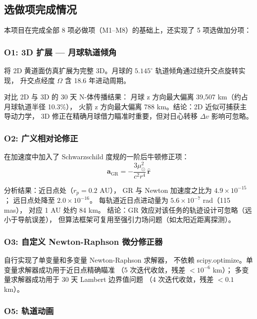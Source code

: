 \documentclass[12pt,a4paper]{ctexart}
\begin{document}
\subsection{选做项完成情况}

本项目在完成全部 8 项必做项（M1--M8）的基础上，还实现了 5 项选做加分项：

\subsubsection*{O1: 3D 扩展 — 月球轨道倾角}

将 2D 黄道面仿真扩展为完整 3D。月球的 $5.145^\circ$ 轨道倾角通过绕升交点旋转实现，
升交点经度 $\Omega$ 含 18.6 年进动周期。

对比 2D 与 3D 的 30 天 N-体传播结果：
月球 z 方向最大偏离 39{,}507 km（约占月球轨道半径 10.3\%），
火箭 z 方向最大偏离 788 km。结论：2D 近似可捕获主导动力学，
3D 修正在精确月球借力瞄准时重要，但对日心转移 $\Delta v$ 影响可忽略。

\subsubsection*{O2: 广义相对论修正}

在加速度中加入了 Schwarzschild 度规的一阶后牛顿修正项：
\begin{equation}
\mathbf{a}_{\text{GR}} = -\frac{3\mu_\odot^2}{c^2 r^4}\,\hat{\mathbf{r}}
\end{equation}

分析结果：近日点处（$r_p = 0.2$ AU），
GR 与 Newton 加速度之比为 $4.9 \times 10^{-15}$；
远日点处降至 $2.0 \times 10^{-16}$。
每轨道近日点进动量为 $5.6 \times 10^{-7}$ rad（115 mas），
对应 1 AU 处约 84 km。
结论：GR 效应对该任务的轨迹设计可忽略（远小于导航误差），
但算法框架可复用至强引力场问题（如太阳近距离探测）。

\subsubsection*{O3: 自定义 Newton-Raphson 微分修正器}

自行实现了单变量和多变量 Newton-Raphson 求解器，
不依赖 scipy.optimize。单变量求解器成功用于近日点精确瞄准
（5 次迭代收敛，残差 $< 10^{-6}$ km）；
多变量求解器成功用于 30 天 Lambert 边界值问题
（4 次迭代收敛，残差 $< 0.1$ km）。

\subsubsection*{O5: 轨道动画}
\end{document}
